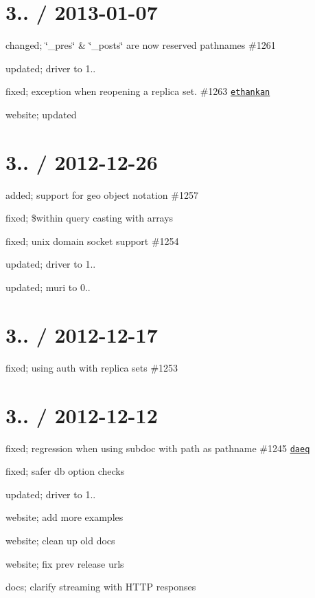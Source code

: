 \section*{3.. / 2013-\/01-\/07 }


\begin{DoxyItemize}
\item changed; \char`\"{}\+\_\+pres\char`\"{} \& \char`\"{}\+\_\+posts\char`\"{} are now reserved pathnames \#1261
\item updated; driver to 1..
\item fixed; exception when reopening a replica set. \#1263 \href{https://github.com/ethankan}{\tt ethankan}
\item website; updated
\end{DoxyItemize}

\section*{3.. / 2012-\/12-\/26 }


\begin{DoxyItemize}
\item added; support for geo object notation \#1257
\item fixed; \$within query casting with arrays
\item fixed; unix domain socket support \#1254
\item updated; driver to 1..
\item updated; muri to 0..
\end{DoxyItemize}

\section*{3.. / 2012-\/12-\/17 }


\begin{DoxyItemize}
\item fixed; using auth with replica sets \#1253
\end{DoxyItemize}

\section*{3.. / 2012-\/12-\/12 }


\begin{DoxyItemize}
\item fixed; regression when using subdoc with {\ttfamily path} as pathname \#1245 \href{https://github.com/daeq}{\tt daeq}
\item fixed; safer db option checks
\item updated; driver to 1..
\item website; add more examples
\item website; clean up old docs
\item website; fix prev release urls
\item docs; clarify streaming with H\+T\+TP responses
\end{DoxyItemize}


